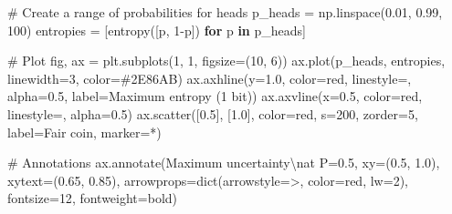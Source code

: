 \documentclass[
  11pt,
  letterpaper,
  oneside,
  openany]{book}
\newenvironment{Shaded}{\begin{snugshade}}{\end{snugshade}}
\newcommand{\BuiltInTok}[1]{\textcolor[rgb]{0.00,0.23,0.31}{#1}}
\newcommand{\CharTok}[1]{\textcolor[rgb]{0.13,0.47,0.30}{#1}}
\newcommand{\CommentTok}[1]{\textcolor[rgb]{0.37,0.37,0.37}{#1}}
\newcommand{\ControlFlowTok}[1]{\textcolor[rgb]{0.00,0.23,0.31}{\textbf{#1}}}
\newcommand{\DecValTok}[1]{\textcolor[rgb]{0.68,0.00,0.00}{#1}}
\newcommand{\FloatTok}[1]{\textcolor[rgb]{0.68,0.00,0.00}{#1}}
\newcommand{\KeywordTok}[1]{\textcolor[rgb]{0.00,0.23,0.31}{\textbf{#1}}}
\newcommand{\NormalTok}[1]{\textcolor[rgb]{0.00,0.23,0.31}{#1}}
\newcommand{\OperatorTok}[1]{\textcolor[rgb]{0.37,0.37,0.37}{#1}}
\newcommand{\StringTok}[1]{\textcolor[rgb]{0.13,0.47,0.30}{#1}}
\begin{document}
\begin{Shaded}
\begin{Highlighting}[]
\CommentTok{\# Create a range of probabilities for heads}
\NormalTok{p\_heads }\OperatorTok{=}\NormalTok{ np.linspace(}\FloatTok{0.01}\NormalTok{, }\FloatTok{0.99}\NormalTok{, }\DecValTok{100}\NormalTok{)}
\NormalTok{entropies }\OperatorTok{=}\NormalTok{ [entropy([p, }\DecValTok{1}\OperatorTok{{-}}\NormalTok{p]) }\ControlFlowTok{for}\NormalTok{ p }\KeywordTok{in}\NormalTok{ p\_heads]}

\CommentTok{\# Plot}
\NormalTok{fig, ax }\OperatorTok{=}\NormalTok{ plt.subplots(}\DecValTok{1}\NormalTok{, }\DecValTok{1}\NormalTok{, figsize}\OperatorTok{=}\NormalTok{(}\DecValTok{10}\NormalTok{, }\DecValTok{6}\NormalTok{))}
\NormalTok{ax.plot(p\_heads, entropies, linewidth}\OperatorTok{=}\DecValTok{3}\NormalTok{, color}\OperatorTok{=}\StringTok{\textquotesingle{}\#2E86AB\textquotesingle{}}\NormalTok{)}
\NormalTok{ax.axhline(y}\OperatorTok{=}\FloatTok{1.0}\NormalTok{, color}\OperatorTok{=}\StringTok{\textquotesingle{}red\textquotesingle{}}\NormalTok{, linestyle}\OperatorTok{=}\StringTok{\textquotesingle{}{-}{-}\textquotesingle{}}\NormalTok{, alpha}\OperatorTok{=}\FloatTok{0.5}\NormalTok{, }
\NormalTok{           label}\OperatorTok{=}\StringTok{\textquotesingle{}Maximum entropy (1 bit)\textquotesingle{}}\NormalTok{)}
\NormalTok{ax.axvline(x}\OperatorTok{=}\FloatTok{0.5}\NormalTok{, color}\OperatorTok{=}\StringTok{\textquotesingle{}red\textquotesingle{}}\NormalTok{, linestyle}\OperatorTok{=}\StringTok{\textquotesingle{}{-}{-}\textquotesingle{}}\NormalTok{, alpha}\OperatorTok{=}\FloatTok{0.5}\NormalTok{)}
\NormalTok{ax.scatter([}\FloatTok{0.5}\NormalTok{], [}\FloatTok{1.0}\NormalTok{], color}\OperatorTok{=}\StringTok{\textquotesingle{}red\textquotesingle{}}\NormalTok{, s}\OperatorTok{=}\DecValTok{200}\NormalTok{, zorder}\OperatorTok{=}\DecValTok{5}\NormalTok{, }
\NormalTok{           label}\OperatorTok{=}\StringTok{\textquotesingle{}Fair coin\textquotesingle{}}\NormalTok{, marker}\OperatorTok{=}\StringTok{\textquotesingle{}*\textquotesingle{}}\NormalTok{)}

\CommentTok{\# Annotations}
\NormalTok{ax.annotate(}\StringTok{\textquotesingle{}Maximum uncertainty}\CharTok{\textbackslash{}n}\StringTok{at P=0.5\textquotesingle{}}\NormalTok{, xy}\OperatorTok{=}\NormalTok{(}\FloatTok{0.5}\NormalTok{, }\FloatTok{1.0}\NormalTok{), }
\NormalTok{            xytext}\OperatorTok{=}\NormalTok{(}\FloatTok{0.65}\NormalTok{, }\FloatTok{0.85}\NormalTok{),}
\NormalTok{            arrowprops}\OperatorTok{=}\BuiltInTok{dict}\NormalTok{(arrowstyle}\OperatorTok{=}\StringTok{\textquotesingle{}{-}\textgreater{}\textquotesingle{}}\NormalTok{, color}\OperatorTok{=}\StringTok{\textquotesingle{}red\textquotesingle{}}\NormalTok{, lw}\OperatorTok{=}\DecValTok{2}\NormalTok{),}
\NormalTok{            fontsize}\OperatorTok{=}\DecValTok{12}\NormalTok{, fontweight}\OperatorTok{=}\StringTok{\textquotesingle{}bold\textquotesingle{}}\NormalTok{)}


\end{Highlighting}
\end{Shaded}
\end{document}
